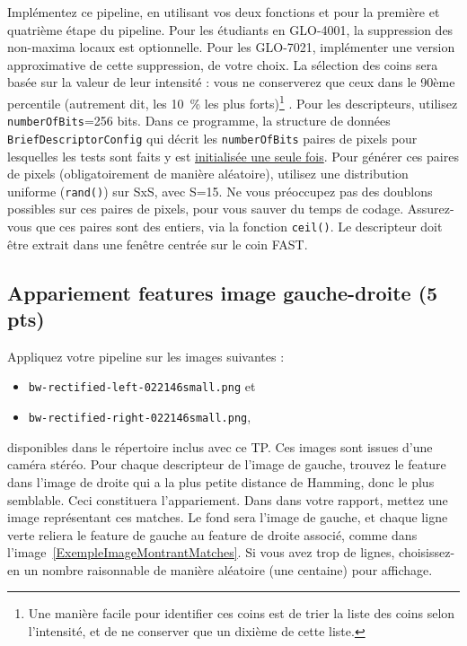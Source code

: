 \documentclass[12pt]{article}
\begin{document}
Implémentez ce pipeline, en utilisant vos deux fonctions  et  pour la première et quatrième étape du pipeline. Pour les étudiants en GLO-4001, la suppression des non-maxima locaux est optionnelle. Pour les GLO-7021, implémenter une version approximative de cette suppression, de votre choix. La sélection des coins sera basée sur la valeur de leur intensité : vous ne conserverez que ceux dans le 90ème percentile (autrement dit, les 10~\% les plus forts)\footnote{Une manière facile pour identifier ces coins est de trier la liste des coins selon l'intensité, et de ne conserver que un dixième de cette liste.} . Pour les descripteurs, utilisez \texttt{numberOfBits}=256 bits. Dans ce programme, la structure de données \texttt{BriefDescriptorConfig} qui décrit les \texttt{numberOfBits} paires de pixels pour lesquelles les tests sont faits y est  \underline{initialisée une seule fois}. Pour générer ces paires de pixels (obligatoirement de manière aléatoire), utilisez une distribution uniforme (\texttt{rand()}) sur SxS, avec S=15. Ne vous préoccupez pas des doublons possibles sur ces paires de pixels, pour vous sauver du temps de codage. Assurez-vous que ces paires sont des entiers, via la fonction \texttt{ceil()}. Le descripteur doit être extrait dans une fenêtre centrée sur le coin FAST.


\subsection{Appariement features image gauche-droite (5 pts)}
 Appliquez votre pipeline sur les images suivantes :
 \begin{itemize}
 \item \texttt{bw-rectified-left-022146small.png} et
 \item \texttt{bw-rectified-right-022146small.png}, 
 \end{itemize}
 disponibles dans le répertoire inclus avec ce TP. Ces images sont issues d'une caméra stéréo. Pour chaque descripteur de l'image de gauche, trouvez le feature dans l'image de droite qui a la plus petite distance de Hamming, donc le plus semblable. Ceci constituera l'appariement. Dans dans votre rapport, mettez une image représentant ces matches. Le fond sera l'image de gauche, et chaque ligne verte reliera le feature de gauche au feature de droite associé, comme dans l'image~\ref{ExempleImageMontrantMatches}. Si vous avez trop de lignes, choisissez-en un nombre raisonnable de manière aléatoire (une centaine) pour affichage.
\end{document}
